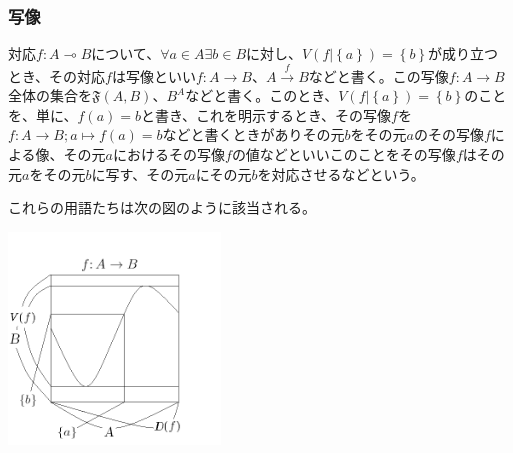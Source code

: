 \documentclass[a4paper]{jsarticle}
\begin{document}
\subsubsection{写像}%
\begin{dfn}
対応$f:A \multimap B$について、$\forall a \in A\exists b \in B$に対し、$V\left( f|\left\{ a \right\} \right) = \left\{ b \right\}$が成り立つとき、その対応$f$は写像といい$f:A \rightarrow B$、$A\overset{f}{\rightarrow}B$などと書く。この写像$f:A \rightarrow B$全体の集合を$\mathfrak{F}(A,B)$、$B^{A}$などと書く。このとき、$V\left( f|\left\{ a \right\} \right) = \left\{ b \right\}$のことを、単に、$f(a) = b$と書き、これを明示するとき、その写像$f$を$f:A \rightarrow B;a \mapsto f(a) = b$などと書くときがありその元$b$をその元$a$のその写像$f$による像、その元$a$におけるその写像$f$の値などといいこのことをその写像$f$はその元$a$をその元$b$に写す、その元$a$にその元$b$を対応させるなどという。
\end{dfn}
これらの用語たちは次の図のように該当される。
\begin{center}
\includegraphics[width=160pt]{1.2.1.b.png}
\end{center}
\end{document}
